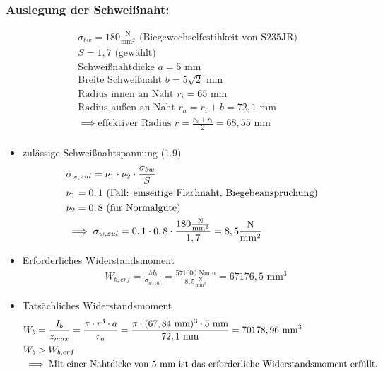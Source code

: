 \subsubsection{Auslegung der Schweißnaht:}
\begin{align*}
	&\sigma_{bw} = 180 \frac{\text{N}}{\text{mm}^2} \text{ (Biegewechselfestihkeit von S235JR)} \\
	&S = 1,7 \text{ (gewählt)} \\
	&\text{Schweißnahtdicke }a= 5 \text{ mm} \\
	&\text{Breite Schweißnaht } b= 5 \sqrt{2} \text{ mm}\\
	&\text{Radius innen an Naht } r_i = 65 \text{ mm} \\
	&\text{Radius außen an Naht } r_a = r_i + b = 72,1\text{ mm} \\
	&\implies \text{effektiver Radius } r = \frac{r_a + r_i}{2} = 68,55\text{ mm} \\
\end{align*}
\begin{itemize}
\item zulässige Schweißnahtspannung \hfill (1.9)
	\begin{align*}
	&\sigma_{w,zul} = \nu_1 \cdot \nu_2 \cdot \frac{\sigma_{bw}}{S} \\
	&\nu_1 = 0,1 \text{ (Fall: einseitige Flachnaht, Biegebeanspruchung)}\\
	&\nu_2 = 0,8 \text{ (für Normalgüte)}\\
	&\implies \sigma_{w,zul} = 0,1 \cdot 0,8 \cdot \frac{180 \frac{\text{N}}{\text{mm}^2}}{1,7} = 8,5 \frac{\text{N}}{\text{mm}^2}
	\end{align*}
\item Erforderliches Widerstandsmoment
	\begin{align*}
	&W_{b,erf} = \frac{M_b}{\sigma_{w,zul}} = \frac{ 571000 \text{ Nmm} }{8,5 \frac{\text{N}}{\text{mm}^2}} = 67176,5 \text{ mm}^3 
	\end{align*}
\item Tatsächliches Widerstandsmoment
	\begin{align*}
	&W_{b} = \frac{I_b}{z_{max}} = \frac{ \pi \cdot r^3 \cdot a }{r_a} = \frac{ \pi \cdot (67,84 \text{ mm})^3 \cdot 5 \text{ mm}} {72,1\text{ mm}} = 70178,96 \text{ mm}^3 \\
	&W_b > W_{b,erf} \\
	&\implies \text{Mit einer Nahtdicke von 5 mm ist das erforderliche Widerstandsmoment erfüllt.}
	\end{align*}
\end{itemize}
